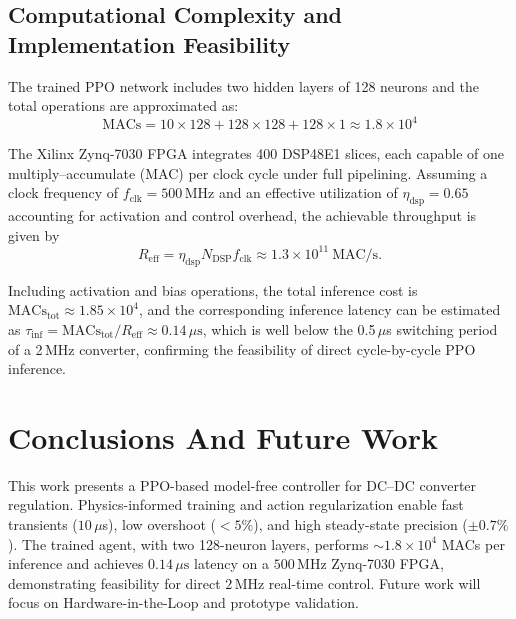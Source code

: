 \documentclass[conference]{IEEEtran}
\begin{document}
\subsection{Computational Complexity and Implementation Feasibility}

The trained PPO network includes two hidden layers of 128 neurons and the total operations are approximated as:
\begin{equation}
\mathrm{MACs}=10\times128+128\times128+128\times1\approx1.8\times10^{4}
\end{equation}

The Xilinx Zynq-7030 FPGA integrates 400 DSP48E1 slices, each capable of one multiply–accumulate (MAC) per clock cycle under full pipelining. 
Assuming a clock frequency of $f_{\text{clk}}=500$\,MHz and an effective utilization of $\eta_{\text{dsp}}=0.65$ accounting for activation and control overhead, 
the achievable throughput is given by
\begin{equation}
R_{\text{eff}}=\eta_{\text{dsp}} N_{\text{DSP}} f_{\text{clk}}
\approx1.3\times10^{11}~\text{MAC/s}.
\end{equation}

Including activation and bias operations, the total inference cost is $\mathrm{MACs}_{\text{tot}}\!\approx\!1.85\times10^{4}$, and the corresponding inference latency can be estimated as $\tau_{\text{inf}}\!=\!\mathrm{MACs}_{\text{tot}}/R_{\text{eff}}\!\approx\!0.14\,\mu\text{s}$, which is well below the 0.5\,$\mu$s switching period of a 2\,MHz converter, confirming the feasibility of direct cycle-by-cycle PPO inference.


\section{Conclusions And Future Work}

This work presents a PPO-based model-free controller for DC--DC converter regulation. 
Physics-informed training and action regularization enable fast transients ($10\,\mu$s), low overshoot ($<5\%$), 
and high steady-state precision ($\pm0.7\%$). 
The trained agent, with two 128-neuron layers, performs $\sim1.8\times10^{4}$ MACs per inference 
and achieves $0.14\,\mu\text{s}$ latency on a $500\,\text{MHz}$ Zynq-7030 FPGA, 
demonstrating feasibility for direct $2\,\text{MHz}$ real-time control. 
Future work will focus on Hardware-in-the-Loop and prototype validation.



 
\end{document}
